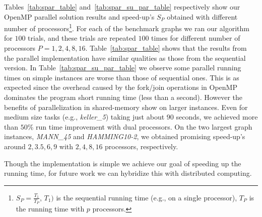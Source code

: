 \documentclass[11pt]{article}
\begin{document}
Tables~\ref{tab:spar_table} and~\ref{tab:spar_su_par_table} respectively show our OpenMP parallel solution results and speed-up's $S_P$ obtained with different number of processors\footnote{$S_P = \frac{T_1}{T_P}$, $T_1)$ is the sequential running time (e.g., on a single processor), $T_P$ is the running time with $p$ processors.}. For each of the benchmark graphs we ran our algorithm for $100$ trials, and these trials are repeated $100$ times for different number of processors $P=1,2,4,8,16$.  Table~\ref{tab:spar_table} shows that the results from the parallel implementation have similar qualities as those from the sequential version.  In Table~\ref{tab:spar_su_par_table} we observe some parallel running times on simple instances are worse than those of sequential ones. This is as expected since the overhead caused by the fork/join operations in OpenMP dominates the program short running time (less than a second).  However the benefits of parallelization in shared-memory show on larger instances.  Even for medium size tasks (e.g., \textit{keller\_5}) taking just about $90$ seconds, we achieved more than $50\%$ run time improvement with dual processors.  On the two largest graph instances, \textit{MANN\_45} and \textit{HAMMING10-2}, we obtained promising speed-up's around $2, 3.5, 6, 9$ with $2,4,8,16$ processors, respectively.


Though the implementation is simple we achieve our goal of speeding up the running time, for future work we can hybridize this with distributed computing.  %
\end{document}
